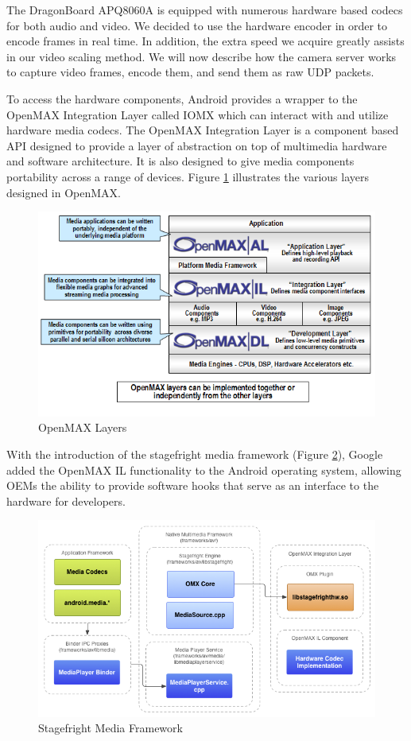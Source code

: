 \documentclass[a4paper,12pt]{article}
\begin{document}
The DragonBoard APQ8060A is equipped with numerous hardware based codecs for both audio and video. We decided to use the hardware encoder in order to encode frames in real time. In addition, the extra speed we acquire greatly assists in our video scaling method. We will now describe how the camera server works to capture video frames, encode them, and send them as raw UDP packets.

To access the hardware components, Android provides a wrapper to the OpenMAX Integration Layer called IOMX which can interact with and utilize hardware media codecs. The OpenMAX Integration Layer is a component based API designed to provide a layer of abstraction on top of multimedia hardware and software architecture. It is also designed to give media components portability across a range of devices. Figure \ref{fig:OpenMAX} illustrates the various layers designed in OpenMAX. 
\begin{figure}[h]
\centering
\includegraphics[width=0.5\linewidth]{openmax.png}
\caption{OpenMAX Layers}
\label{fig:OpenMAX}
\end{figure}

With the introduction of the stagefright media framework (Figure \ref{fig:Stagefright}), Google added the OpenMAX IL functionality to the Android operating system, allowing OEMs the ability to provide software hooks that serve as an interface to the hardware for developers.
\begin{figure}[h]
\centering
\includegraphics[width=0.5\linewidth]{stagefright.png}
\caption{Stagefright Media Framework}
\label{fig:Stagefright}
\end{figure}
\end{document}
